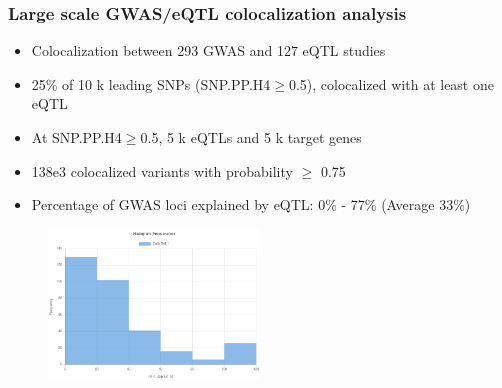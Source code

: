 \documentclass{beamer}
\begin{document}
    \begin{frame}
        \frametitle{Large scale GWAS/eQTL colocalization analysis}


        \begin{itemize}
            \item Colocalization between 293 GWAS and 127 eQTL studies
            \item 25\% of 10 k leading SNPs (SNP.PP.H4$\geq$0.5), colocalized with at least one eQTL
            \item At SNP.PP.H4$\geq$0.5, 5 k eQTLs and 5 k target genes
            \item 138e3 colocalized variants with probability $\geq$ 0.75
            \item Percentage of GWAS loci explained by eQTL: 0$\%$ - 77$\%$ (Average 33$\%$)
        \end{itemize}

        \begin{figure}[!]
            \includegraphics[width=0.5\textwidth]{fig/histogram_explained.png}\label{fig:perc_explained}
        \end{figure}

    \end{frame}
\end{document}
